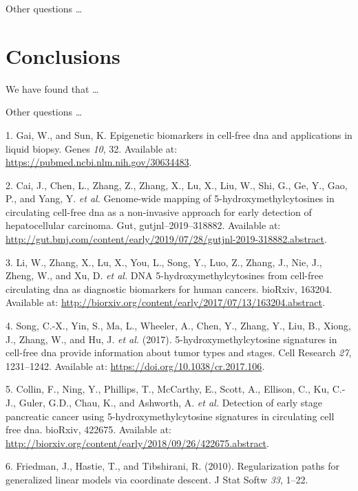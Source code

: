\documentclass[
]{book}
\newenvironment{cslreferences}%
  {}%
  {\par}
\begin{document}
Other questions \ldots{}

\hypertarget{conclusions}{%
\chapter{Conclusions}\label{conclusions}}

We have found that \ldots{}

Other questions \ldots{}

\hypertarget{refs}{}
\begin{cslreferences}
\leavevmode\hypertarget{ref-Gai:2019aa}{}%
1. Gai, W., and Sun, K. Epigenetic biomarkers in cell-free dna and applications in liquid biopsy. Genes \emph{10}, 32. Available at: \url{https://pubmed.ncbi.nlm.nih.gov/30634483}.

\leavevmode\hypertarget{ref-Cai:2019aa}{}%
2. Cai, J., Chen, L., Zhang, Z., Zhang, X., Lu, X., Liu, W., Shi, G., Ge, Y., Gao, P., and Yang, Y. \emph{et al.} Genome-wide mapping of 5-hydroxymethylcytosines in circulating cell-free dna as a non-invasive approach for early detection of hepatocellular carcinoma. Gut, gutjnl--2019--318882. Available at: \url{http://gut.bmj.com/content/early/2019/07/28/gutjnl-2019-318882.abstract}.

\leavevmode\hypertarget{ref-Li:2017aa}{}%
3. Li, W., Zhang, X., Lu, X., You, L., Song, Y., Luo, Z., Zhang, J., Nie, J., Zheng, W., and Xu, D. \emph{et al.} DNA 5-hydroxymethylcytosines from cell-free circulating dna as diagnostic biomarkers for human cancers. bioRxiv, 163204. Available at: \url{http://biorxiv.org/content/early/2017/07/13/163204.abstract}.

\leavevmode\hypertarget{ref-Song:2017aa}{}%
4. Song, C.-X., Yin, S., Ma, L., Wheeler, A., Chen, Y., Zhang, Y., Liu, B., Xiong, J., Zhang, W., and Hu, J. \emph{et al.} (2017). 5-hydroxymethylcytosine signatures in cell-free dna provide information about tumor types and stages. Cell Research \emph{27}, 1231--1242. Available at: \url{https://doi.org/10.1038/cr.2017.106}.

\leavevmode\hypertarget{ref-Collin:2018aa}{}%
5. Collin, F., Ning, Y., Phillips, T., McCarthy, E., Scott, A., Ellison, C., Ku, C.-J., Guler, G.D., Chau, K., and Ashworth, A. \emph{et al.} Detection of early stage pancreatic cancer using 5-hydroxymethylcytosine signatures in circulating cell free dna. bioRxiv, 422675. Available at: \url{http://biorxiv.org/content/early/2018/09/26/422675.abstract}.

\leavevmode\hypertarget{ref-Friedman:2010aa}{}%
6. Friedman, J., Hastie, T., and Tibshirani, R. (2010). Regularization paths for generalized linear models via coordinate descent. J Stat Softw \emph{33}, 1--22.


\end{cslreferences}
\end{document}
